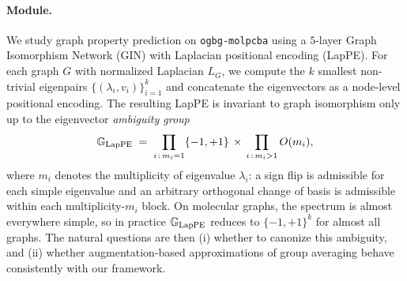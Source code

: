\paragraph{Module.}
We study graph property prediction on \texttt{ogbg-molpcba} using a
$5$-layer Graph Isomorphism Network (GIN) with Laplacian positional
encoding (LapPE). For each graph $G$ with normalized Laplacian
$L_G$, we compute the $k$ smallest non-trivial eigenpairs
$\{(\lambda_i, v_i)\}_{i=1}^{k}$ and concatenate the eigenvectors as a
node-level positional encoding. The resulting LapPE is invariant to
graph isomorphism only up to the eigenvector \emph{ambiguity group}
\[
  \mathbb{G}_{\mathrm{LapPE}} \;=\; \prod_{i\,:\,m_i=1}\{-1,+1\} \,\times\, \prod_{i\,:\,m_i>1} O(m_i),
\]
where $m_i$ denotes the multiplicity of eigenvalue $\lambda_i$: a sign
flip is admissible for each simple eigenvalue and an arbitrary orthogonal
change of basis is admissible within each multiplicity-$m_i$ block. On
molecular graphs, the spectrum is almost everywhere simple, so in
practice $\mathbb{G}_{\mathrm{LapPE}}$ reduces to $\{-1,+1\}^{k}$ for almost all
graphs. The natural questions are then (i) whether to canonize this
ambiguity, and (ii) whether augmentation-based approximations of group
averaging behave consistently with our framework.

